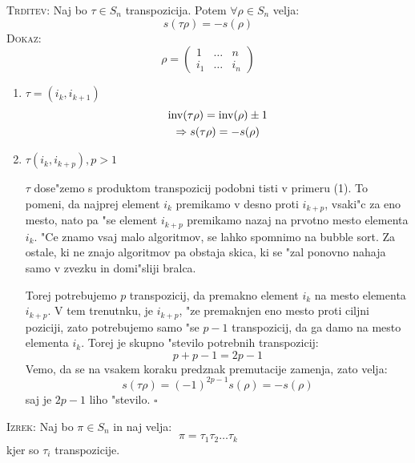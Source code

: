 \textsc{Trditev:} Naj bo $\tau \in S_n$ transpozicija. Potem $\forall \rho \in S_n$ velja:
\begin{equation*}
s(\tau \rho) = -s(\rho)
\end{equation*}
\textsc{Dokaz:}
\begin{equation*}
\rho = \begin{pmatrix}
1 & \ldots & n \\
i_1 & \ldots & i_n
\end{pmatrix}
\end{equation*}
\begin{enumerate}[1)]
	\item $\tau = (i_k, i_{k+1})$
	\begin{gather*}
	\text{inv} (\tau \rho) = \text{inv} (\rho) \pm 1 \\
	\Rightarrow s(\tau \rho) = - s(\rho)
	\end{gather*}
	
	\item $\tau (i_k, i_{k+p}), p > 1$
	
	$\tau$ dose"zemo s produktom transpozicij podobni tisti v primeru (1). To pomeni, da najprej element $i_k$ premikamo v desno proti $i_{k+p}$, vsaki"c za eno mesto, nato pa "se element $i_{k+p}$ premikamo nazaj na prvotno mesto elementa $i_k$. "Ce znamo vsaj malo algoritmov, se lahko spomnimo na bubble sort. Za ostale, ki ne znajo algoritmov pa obstaja skica, ki se "zal ponovno nahaja samo v zvezku in domi"sliji bralca.
	
	Torej potrebujemo $p$ transpozicij, da premakno element $i_k$ na mesto elementa $i_{k+p}$.  V tem trenutnku, je $i_{k+p}$, "ze premaknjen eno mesto proti ciljni poziciji, zato potrebujemo samo "se $p-1$ transpozicij, da ga damo na mesto elementa $i_k$. Torej je skupno "stevilo potrebnih transpozicij:
	\begin{equation*}
	p + p-1 = 2p - 1
	\end{equation*}
	Vemo, da se na vsakem koraku predznak premutacije zamenja, zato velja:
	\begin{equation*}
	s(\tau \rho) = (-1)^{2p - 1} s(\rho) = -s (\rho)
	\end{equation*}
	saj je $2p - 1$ liho "stevilo. \hfill $\square$
\end{enumerate}

\textsc{Izrek:} Naj bo $\pi \in S_n$ in naj velja:
\begin{equation*}
\pi = \tau_1 \tau_2 \ldots \tau_k
\end{equation*}
kjer so $\tau_i$ transpozicije.

